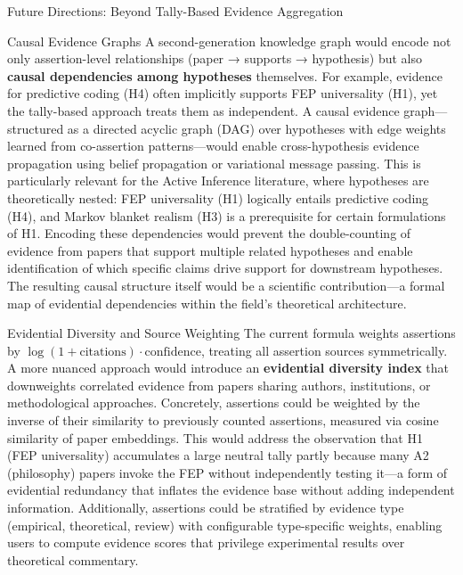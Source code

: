\documentclass[
  ignorenonframetext,
]{beamer}
\begin{document}
\begin{frame}{Future Directions: Beyond Tally-Based Evidence
Aggregation}
\begin{block}{Causal Evidence Graphs}
\protect{}\label{causal-evidence-graphs}
A second-generation knowledge graph would encode not only
assertion-level relationships (paper → supports → hypothesis) but also
\textbf{causal dependencies among hypotheses} themselves. For example,
evidence for predictive coding (H4) often implicitly supports FEP
universality (H1), yet the tally-based approach treats them as
independent. A causal evidence graph---structured as a directed acyclic
graph (DAG) over hypotheses with edge weights learned from co-assertion
patterns---would enable cross-hypothesis evidence propagation using
belief propagation or variational message passing. This is particularly
relevant for the Active Inference literature, where hypotheses are
theoretically nested: FEP universality (H1) logically entails predictive
coding (H4), and Markov blanket realism (H3) is a prerequisite for
certain formulations of H1. Encoding these dependencies would prevent
the double-counting of evidence from papers that support multiple
related hypotheses and enable identification of which specific claims
drive support for downstream hypotheses. The resulting causal structure
itself would be a scientific contribution---a formal map of evidential
dependencies within the field's theoretical architecture.
\end{block}

\begin{block}{Evidential Diversity and Source Weighting}
\protect{}\label{evidential-diversity-and-source-weighting}
The current formula weights assertions by
\(\log(1 + \text{citations}) \cdot \text{confidence}\), treating all
assertion sources symmetrically. A more nuanced approach would introduce
an \textbf{evidential diversity index} that downweights correlated
evidence from papers sharing authors, institutions, or methodological
approaches. Concretely, assertions could be weighted by the inverse of
their similarity to previously counted assertions, measured via cosine
similarity of paper embeddings. This would address the observation that
H1 (FEP universality) accumulates a large neutral tally partly because
many A2 (philosophy) papers invoke the FEP without independently testing
it---a form of evidential redundancy that inflates the evidence base
without adding independent information. Additionally, assertions could
be stratified by evidence type (empirical, theoretical, review) with
configurable type-specific weights, enabling users to compute evidence
scores that privilege experimental results over theoretical commentary.
\end{block}


\end{frame}
\end{document}
